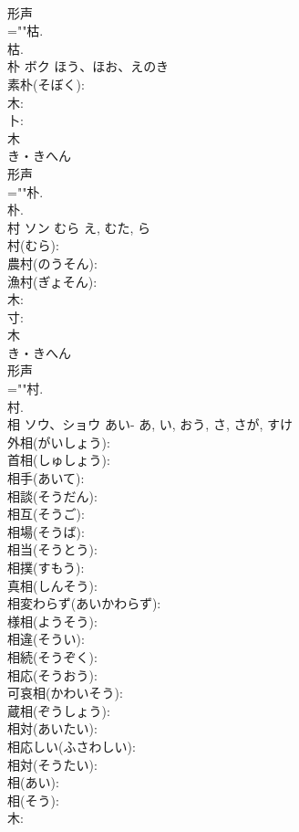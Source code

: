\documentclass[8pt]{extreport}
\begin{document}
\begin{CJK}{UTF8}{min}
\\	形声 
\\	=""枯.
\\	枯.
\\	朴	ボク	ほう、ほお、えのき		
\\	素朴(そぼく): 
\\	木: 
\\	卜: 
\\	木	
\\	き・きへん	
\\	形声 
\\	=""朴.
\\	朴.
\\	村	ソン	むら	え, むた, ら	
\\	村(むら): 
\\	農村(のうそん): 
\\	漁村(ぎょそん): 
\\	木: 
\\	寸: 
\\	木	
\\	き・きへん	
\\	形声 
\\	=""村.
\\	村.
\\	相	ソウ、ショウ	あい-	あ, い, おう, さ, さが, すけ	
\\	外相(がいしょう): 
\\	首相(しゅしょう): 
\\	相手(あいて): 
\\	相談(そうだん): 
\\	相互(そうご): 
\\	相場(そうば): 
\\	相当(そうとう): 
\\	相撲(すもう): 
\\	真相(しんそう): 
\\	相変わらず(あいかわらず): 
\\	様相(ようそう): 
\\	相違(そうい): 
\\	相続(そうぞく): 
\\	相応(そうおう): 
\\	可哀相(かわいそう): 
\\	蔵相(ぞうしょう): 
\\	相対(あいたい): 
\\	相応しい(ふさわしい): 
\\	相対(そうたい): 
\\	相(あい): 
\\	相(そう): 
\\	木: 

\end{CJK}
\end{document}
